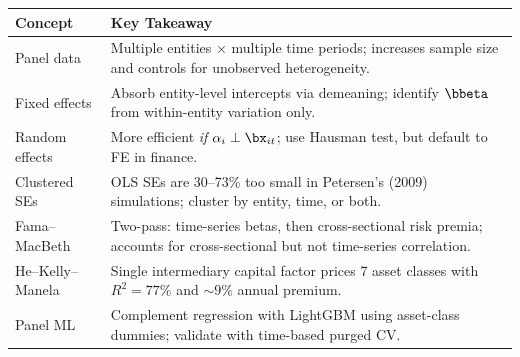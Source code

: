 \begin{center}
\begin{tabular}{lp{10cm}}
  \toprule
  \textbf{Concept} & \textbf{Key Takeaway} \\
  \midrule
  Panel data & Multiple entities $\times$ multiple time periods; increases sample size and controls for unobserved heterogeneity. \\
  Fixed effects & Absorb entity-level intercepts via demeaning; identify $\bbeta$ from within-entity variation only. \\
  Random effects & More efficient \emph{if} $\alpha_i \perp \bx_{it}$; use Hausman test, but default to FE in finance. \\
  Clustered SEs & OLS SEs are 30--73\% too small in Petersen's (2009) simulations; cluster by entity, time, or both. \\
  Fama--MacBeth & Two-pass: time-series betas, then cross-sectional risk premia; accounts for cross-sectional but not time-series correlation. \\
  He--Kelly--Manela & Single intermediary capital factor prices 7 asset classes with $R^2 = 77\%$ and ${\sim}9\%$ annual premium. \\
  Panel ML & Complement regression with LightGBM using asset-class dummies; validate with time-based purged CV. \\
  \bottomrule
\end{tabular}
\end{center}
